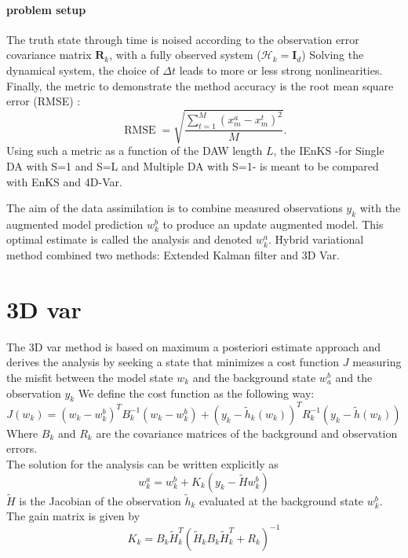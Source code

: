 \documentclass[a4,12pt]{article}
\numberwithin{equation}{section}
\begin{document}
\paragraph{problem setup}
The truth state through time is noised according to the observation error covariance matrix $\textbf{R}_k$, with a fully observed system ($\mathcal{H}_k = \textbf{I}_d$) 
Solving the dynamical system, the choice of $\Delta t$ leads to more or less strong nonlinearities. \\
Finally, the metric to demonstrate the method accuracy is the root mean square error (RMSE) :
$$\operatorname{RMSE}= \sqrt{\frac{\sum_{t=1}^M (x_{m}^{a} - x_{m}^{t})^2}{M}}.$$
Using such a metric as a function of the DAW length $L$, the IEnKS -for Single DA with S=1 and S=L and Multiple DA with S=1- is meant to be compared with EnKS and 4D-Var.




The aim of the data assimilation is to combine measured observations $y_k$ with the augmented model prediction $w_k^b$ to produce an update augmented model. This optimal estimate is called the analysis and denoted $w_k^a$. Hybrid variational method combined two methods: Extended Kalman filter and 3D Var.

\section{3D var}
The 3D var method is based on maximum a posteriori estimate approach and derives the analysis by seeking a state that minimizes a cost function $J$ measuring the misfit between the model state $w_k$ and the background state $w_a^b$ and the observation $y_k$
We define  the cost function as the following way:
\begin{equation}
    J(w_k) = (w_k - w_k^b)^T B_k^{-1} (w_k - w_k^b) + (y_k - \tilde h_k (w_k)) ^T R_k^{-1} (y_k - \tilde h (w_k)) 
\label{costFunc}
\end{equation}
Where $B_k$ and $R_k$ are the covariance matrices of the background and observation errors. \\
The solution for the analysis can be written explicitly as 
\begin{equation}
    w_k^a = w_k^b + K_k (y_k - \tilde H w_k^b)
\label{sol3D}
\end{equation}
$\tilde H$ is the Jacobian of the observation $\tilde h_k$ evaluated at the background state $w_k^b$. \\
The gain matrix is given by
\begin{equation}
    K_k =  B_k \tilde H_k^T(  \tilde H_k B_k \tilde H_k^T + R_k)^{-1}
\label{matrixGain3D}
\end{equation}
\end{document}
